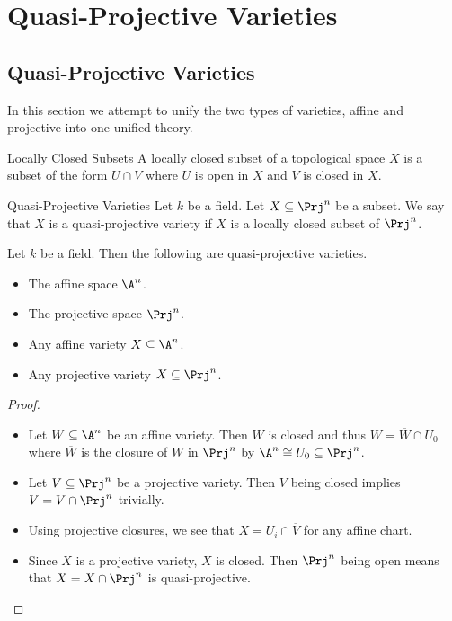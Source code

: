 \documentclass[a4paper]{article}
\begin{document}
\pagebreak
\section{Quasi-Projective Varieties}
\subsection{Quasi-Projective Varieties}
In this section we attempt to unify the two types of varieties, affine and projective into one unified theory. 

\begin{defn}{Locally Closed Subsets}{} A locally closed subset of a topological space $X$ is a subset of the form $U\cap V$ where $U$ is open in $X$ and $V$ is closed in $X$. 
\end{defn}

\begin{defn}{Quasi-Projective Varieties}{} Let $k$ be a field. Let $X\subseteq\Prj^n$ be a subset. We say that $X$ is a quasi-projective variety if $X$ is a locally closed subset of $\Prj^n$. 
\end{defn}

\begin{prp}{}{} Let $k$ be a field. Then the following are quasi-projective varieties. 
\begin{itemize}
\item The affine space $\A^n$. 
\item The projective space $\Prj^n$. 
\item Any affine variety $X\subseteq\A^n$. 
\item Any projective variety $X\subseteq\Prj^n$. 
\end{itemize} 
\begin{proof}~\\
\begin{itemize}
\item Let $W\subseteq\A^n$ be an affine variety. Then $W$ is closed and thus $W=\overline{W}\cap U_0$ where $\overline{W}$ is the closure of $W$ in $\Prj^n$ by $\A^n\cong U_0\subseteq\Prj^n$. 
\item Let $V\subseteq\Prj^n$ be a projective variety. Then $V$ being closed implies $V=V\cap\Prj^n$ trivially. 
\item Using projective closures, we see that $X=U_i\cap\overline{V}$ for any affine chart. 
\item Since $X$ is a projective variety, $X$ is closed. Then $\Prj^n$ being open means that $X=X\cap\Prj^n$ is quasi-projective. 
\end{itemize}
\end{proof}
\end{prp}
\end{document}
